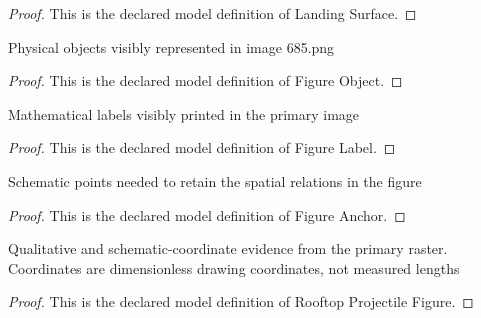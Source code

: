 \begin{proof}
  This is the declared model definition of Landing Surface.
\end{proof}
\begin{definition}
  \label{def:physics:phyx-mini-0685:phyxminiproblems-problemphyxmini0685-figureobject}
  Physical objects visibly represented in image 685.png
\end{definition}
\begin{proof}
  This is the declared model definition of Figure Object.
\end{proof}
\begin{definition}
  \label{def:physics:phyx-mini-0685:phyxminiproblems-problemphyxmini0685-figurelabel}
  Mathematical labels visibly printed in the primary image
\end{definition}
\begin{proof}
  This is the declared model definition of Figure Label.
\end{proof}
\begin{definition}
  \label{def:physics:phyx-mini-0685:phyxminiproblems-problemphyxmini0685-figureanchor}
  Schematic points needed to retain the spatial relations in the figure
\end{definition}
\begin{proof}
  This is the declared model definition of Figure Anchor.
\end{proof}
\begin{definition}
  \label{def:physics:phyx-mini-0685:phyxminiproblems-problemphyxmini0685-rooftopprojectilefigure}
  Qualitative and schematic-coordinate evidence from the primary raster. Coordinates are dimensionless drawing coordinates, not measured lengths
\end{definition}
\begin{proof}
  This is the declared model definition of Rooftop Projectile Figure.
\end{proof}
